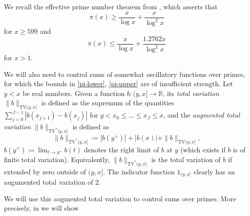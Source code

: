 \documentclass[12pt,a4paper,reqno]{amsart}
\numberwithin{equation}{section}
\theoremstyle{plain}
\theoremstyle{definition}
\newcommand\R{\mathbb{R}}
\begin{document}
We recall the effective prime number theorem from \cite[Corollary 5.2]{dusart}, which asserts that
\begin{equation}\label{pi-lower}
  \pi(x) \geq \frac{x}{\log x} + \frac{x}{\log^2 x}
\end{equation}
for $x \geq 599$ and
\begin{equation}\label{pi-upper}
  \pi(x) \leq \frac{x}{\log x} + \frac{1.2762 x}{\log^2 x}
\end{equation}
for $x >1$.  

We will also need to control sums of somewhat oscillatory functions over primes, for which the bounds in \eqref{pi-lower}, \eqref{pi-upper} are of insufficient strength. Let $y<x$ be real numbers. Given a function $b \colon (y,x] \to \R$, its \emph{total variation}
$\|b\|_{\mathrm{TV}(y,x]}$ is defined as the supremum of the quantities $\sum_{j=0}^{J-1} |b(x_{j+1})-b(x_j)|$ for $y < x_0 \leq \dots \leq x_J \leq x$, and the \emph{augmented total variation} $\|b\|_{\mathrm{TV}^*(y,x]}$ is defined as
$$
\|b\|_{\mathrm{TV}^*(y,x]}
\coloneqq |b(y^+)| + |b(x)| + \|b\|_{\mathrm{TV}(y,x]},$$
$b(y^+) \coloneqq \lim_{t \to y^+} b(t)$ denotes the right limit of $b$ at $y$ (which exists if $b$ is of finite total variation).  Equivalently, $\|b\|_{\mathrm{TV}^*(y,x]}$ is the total variation of $b$ if extended by zero outside of $(y,x]$. The indicator function $1_{(y,x]}$ clearly has an augumented total variation of $2$. 

We will use this augmented total variation to control sums over primes.  More precisely, in  we will show
\end{document}
